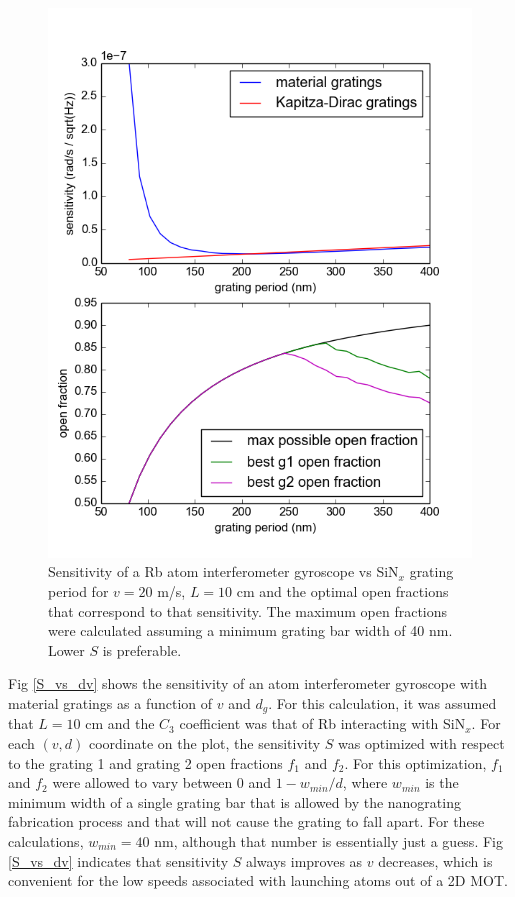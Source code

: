 \documentclass[twocolumn,pra,showpacs,superscriptaddress,longbibliography]{revtex4-1}   %
\begin{document}
\begin{figure}
\includegraphics[width=\linewidth,keepaspectratio]{../plots/Sf1f2_vs_d_Rb_L10cm.png}
\caption{\label{S_vs_d} Sensitivity of a Rb atom interferometer gyroscope vs SiN$_x$ grating period for $v=20$ m/s, $L=10$ cm and the optimal open fractions that correspond to that sensitivity. The maximum open fractions were calculated assuming a minimum grating bar width of 40 nm. Lower $S$ is preferable.}
\end{figure}


Fig \ref{S_vs_dv} shows the sensitivity of an atom interferometer gyroscope with material gratings as a function of $v$ and $d_g$. For this calculation, it was assumed that $L = 10$ cm and the $C_3$ coefficient was that of Rb interacting with SiN$_x$. For each $(v,d)$ coordinate on the plot, the sensitivity $S$ was optimized with respect to the grating 1 and grating 2 open fractions $f_1$ and $f_2$. For this optimization, $f_1$ and $f_2$ were allowed to vary between 0 and $1 - w_{min}/d$, where $w_{min}$ is the minimum width of a single grating bar that is allowed by the nanograting fabrication process and that will not cause the grating to fall apart. For these calculations, $w_{min} = 40$ nm, although that number is essentially just a guess.
Fig \ref{S_vs_dv} indicates that sensitivity $S$ always improves as $v$ decreases, which is convenient for the low speeds associated with launching atoms out of a 2D MOT.
\end{document}
